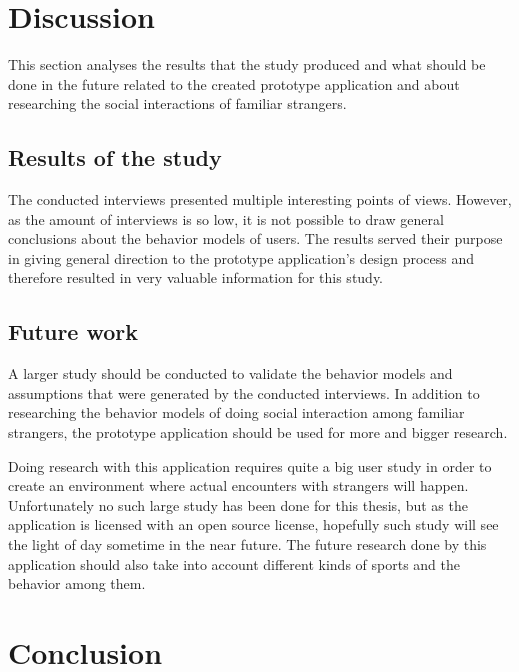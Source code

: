 \section{Discussion}

This section analyses the results that the study produced and what should be done in the future related to the created prototype application and about researching the social interactions of familiar strangers.

\subsection{Results of the study}

The conducted interviews presented multiple interesting points of views. However, as the amount of interviews is so low, it is not possible to draw general conclusions about the behavior models of users. The results served their purpose in giving general direction to the prototype application's design process and therefore resulted in very valuable information for this study.

\subsection{Future work}

A larger study should be conducted to validate the behavior models and assumptions that were generated by the conducted interviews. In addition to researching the behavior models of doing social interaction among familiar strangers, the prototype application should be used for more and bigger research.

Doing research with this application requires quite a big user study in order to create an environment where actual encounters with strangers will happen. Unfortunately no such large study has been done for this thesis, but as the application is licensed with an open source license, hopefully such study will see the light of day sometime in the near future. The future research done by this application should also take into account different kinds of sports and the behavior among them.

\section{Conclusion}



